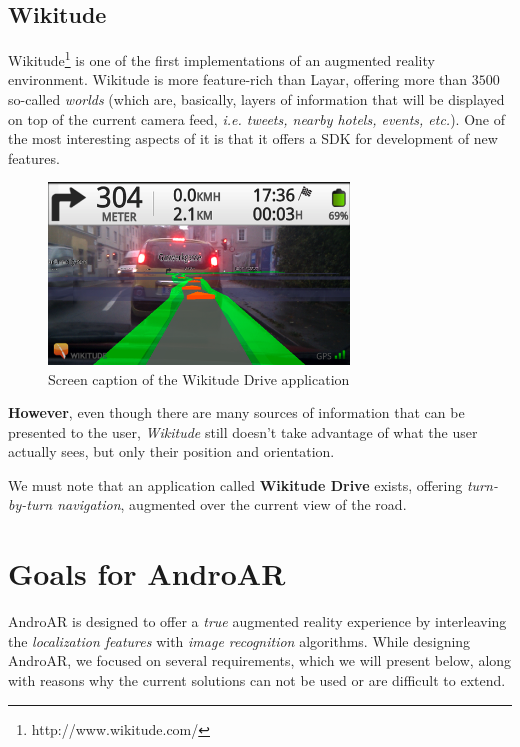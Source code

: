 \documentclass[a4paper,onecolumn,oneside,titlepage,11pt]{report}
\begin{document}
\section{Wikitude}

Wikitude\footnote{http://www.wikitude.com/} is one of the first implementations of an augmented reality environment. Wikitude is more feature-rich than Layar, offering more than $3500$ so-called \emph{worlds} (which are, basically, layers of information that will be displayed on top of the current camera feed, \emph{i.e. tweets, nearby hotels, events, etc.}). One of the most interesting aspects of it is that it offers a SDK for development of new features.

\begin{figure}[H]
\begin{center}
\includegraphics[width=8cm]{../../images/wikitude_drive.png}
\caption{Screen caption of the Wikitude Drive application}
\end{center}
\end{figure}

\textbf{However}, even though there are many sources of information that can be presented to the user, \emph{Wikitude} still doesn't take advantage of what the user actually sees, but only their position and orientation.

We must note that an application called \textbf{Wikitude Drive} exists, offering \emph{turn-by-turn navigation}, augmented over the current view of the road.

\chapter{Goals for AndroAR}
\label{chap:goals}
AndroAR is designed to offer a \emph{true} augmented reality experience by interleaving the \emph{localization features} with \emph{image recognition} algorithms. While designing AndroAR, we focused on several requirements, which we will present below, along with reasons why the current solutions can not be used or are difficult to extend.
\end{document}

